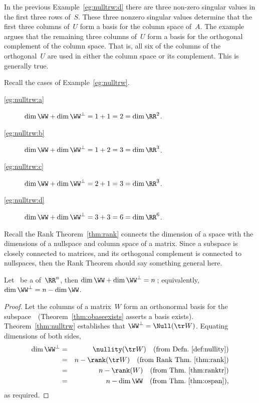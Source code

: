 In the previous Example~\ref{eg:nulltrw:d} there are three non-zero singular values in the first three rows of~\(S\).
These three nonzero singular values determine that the first three columns of~\(U\) form a basis for the column space of~\(A\).
The example argues that the remaining three columns of~\(U\) form a basis for the orthogonal complement of the column space.
That is, all six of the columns of the orthogonal~\(U\) are used in either the column space or its complement.
This is generally true.

\begin{example} \label{eg:orthrank}
Recall the cases of Example~\ref{eg:nulltrw}.
\begin{description}
\item[\ref{eg:nulltrw:a}] \(\dim\WW+\dim\WW^\perp=1+1=2=\dim\RR^2\).
\item[\ref{eg:nulltrw:b}] \(\dim\WW+\dim\WW^\perp=1+2=3=\dim\RR^3\).
\item[\ref{eg:nulltrw:c}] \(\dim\WW+\dim\WW^\perp=2+1=3=\dim\RR^3\).
\item[\ref{eg:nulltrw:d}] \(\dim\WW+\dim\WW^\perp=3+3=6=\dim\RR^6\).
\end{description}
\end{example}

Recall the Rank Theorem~\ref{thm:rank} connects the  dimension of a space with the dimensions of a nullspace and column space of a matrix.
Since a subspace is closely connected to matrices, and its orthogonal complement is connected to nullspaces, then the Rank Theorem should say something general here.



\begin{theorem} \label{thm:orthrank}
Let \WW\ be a  of~\(\RR^n\), then \(\dim\WW+\dim\WW^\perp=n\)\,; equivalently, \(\dim\WW^\perp=n-\dim\WW\).
\end{theorem}

\begin{proof} 
Let the columns of a matrix~\(W\) form an orthonormal basis for the subspace~\WW\ (Theorem~\ref{thm:obaseexists} asserts a basis exists).
Theorem~\ref{thm:nulltrw} establishes that \(\WW^\perp=\Null(\tr W)\).
Equating dimensions of both sides, 
\begin{eqnarray*}
\dim\WW^\perp&=&\nullity(\tr W) 
\quad(\text{from Defn.~\ref{def:nullity}})
\\&=&n-\rank(\tr W)
\quad(\text{from Rank Thm.~\ref{thm:rank}})
\\&=&n-\rank(W)
\quad(\text{from Thm.~\ref{thm:ranktr}})
\\&=&n-\dim\WW
\quad(\text{from Thm.~\ref{thm:ospan}}),
\end{eqnarray*}
as required.
\end{proof}


